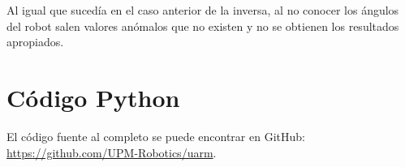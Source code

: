 \documentclass[a4paper,12pt]{article}
\begin{document}
Al igual que sucedía en el caso anterior de la inversa, al no conocer los ángulos del
robot salen valores anómalos que no existen y no se obtienen los resultados apropiados.

\newpage
\printbibliography

\newpage
\appendix
\section{Código Python}

% 








El código fuente al completo se puede encontrar en GitHub:
\href{https://github.com/UPM-Robotics/uarm}{https://github.com/UPM-Robotics/uarm}.
\end{document}
